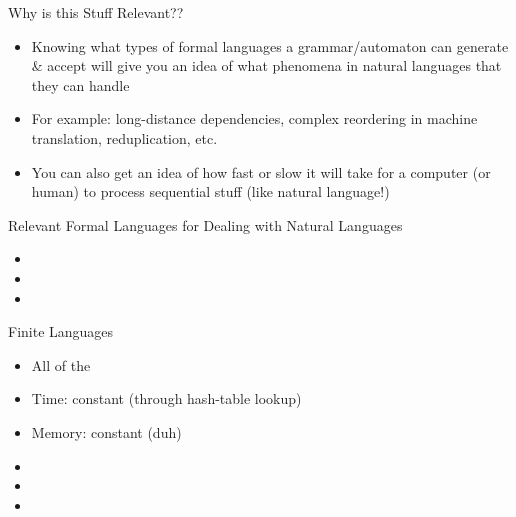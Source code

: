 \documentclass{beamer}
\begin{document}
\begin{frame}{Why is this Stuff Relevant??}
\begin{block}{}
\begin{itemize}
	\item Knowing what types of formal languages a grammar/automaton can generate \& accept will give you an idea of what phenomena in natural languages that they can handle
	\pause
	\item For example: long-distance dependencies, complex reordering in machine translation, reduplication, etc.
	\pause
	\item You can also get an idea of how fast or slow it will take for a computer (or human) to process sequential stuff (like natural language!)
\end{itemize}
\end{block}
\end{frame}


\begin{frame}{Relevant Formal Languages for Dealing with Natural Languages}
\begin{block}{}
\begin{itemize}
	\item 
	\item 
	\item 
\end{itemize}
\end{block}
\end{frame}


\begin{frame}{Finite Languages}
\begin{block}{}
\begin{itemize}
	\item All of the 
	\item Time: constant (through hash-table lookup)
	\item Memory: constant (duh)
\end{itemize}
\end{block}
\end{frame}


\begin{frame}{}
\begin{block}{}
\begin{itemize}
	\item 
	\item 
	\item 
\end{itemize}
\end{block}
\end{frame}
\end{document}
